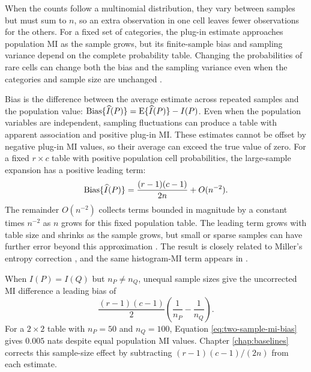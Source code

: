 When the counts follow a multinomial distribution, they vary between samples
but must sum to \(n\), so an extra observation in one cell leaves fewer
observations for the others. For a fixed set of categories, the plug-in
estimate approaches population MI as the sample grows, but its finite-sample
bias and sampling variance depend on the complete probability table.
Changing the probabilities of rare cells can change both the bias and the
sampling variance even when the categories and sample size are unchanged
\citep{paninski2003}.

Bias is the difference between the average estimate across repeated samples
and the population value:
\(\operatorname{Bias}\{\widehat I(P)\}=\operatorname{E}\{\widehat I(P)\}-I(P)\).
Even when the population variables are independent, sampling fluctuations
can produce a table with apparent association and positive plug-in MI.
These estimates cannot be offset by negative plug-in MI values, so their
average can exceed the true value of zero.
For a fixed \(r\times c\) table with positive population cell probabilities,
the large-sample expansion has a positive leading term:
\begin{equation}
  \operatorname{Bias}\{\widehat I(P)\}
  =\frac{(r-1)(c-1)}{2n}+O(n^{-2}).
  \label{eq:mi-leading-bias}
\end{equation}
The remainder \(O(n^{-2})\) collects terms bounded in magnitude by a
constant times \(n^{-2}\) as \(n\) grows for this fixed population table.
The leading term grows with table size and shrinks as the sample grows,
but small or sparse samples can have further error beyond this approximation
\citep{paninski2003}. The result is closely related to Miller's entropy
correction \citep{miller1955}, and the same histogram-MI term appears in
\citet{moddemeijer1989}.

When \(I(P)=I(Q)\) but \(n_P\ne n_Q\), unequal sample sizes give
the uncorrected MI difference a leading bias of
\begin{equation}
  \frac{(r-1)(c-1)}{2}
  \left(\frac{1}{n_P}-\frac{1}{n_Q}\right).
  \label{eq:two-sample-mi-bias}
\end{equation}
For a \(2\times2\) table with \(n_P=50\) and \(n_Q=100\), Equation
\eqref{eq:two-sample-mi-bias} gives \(0.005\) nats despite equal population MI values. Chapter
\ref{chap:baselines} corrects this sample-size effect by subtracting
\((r-1)(c-1)/(2n)\) from each estimate.

\medskip
{}

